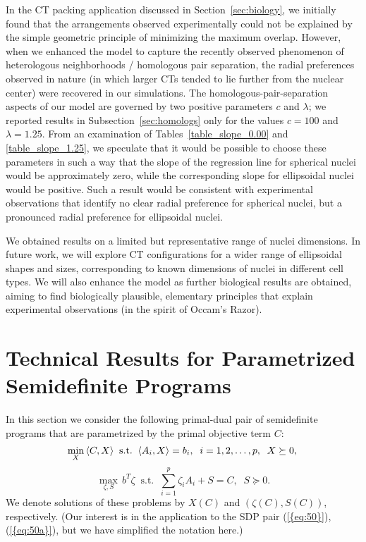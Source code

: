 \documentclass{siamltex}
\begin{document}
In the CT packing application discussed in Section~\ref{sec:biology},
we initially found that the arrangements observed experimentally could
not be explained by the simple geometric principle of minimizing the
maximum overlap. However, when we enhanced the model to capture the
recently observed phenomenon of heterologous neighborhoods /
homologous pair separation, the radial preferences observed in nature
(in which larger CTs tended to lie further from the nuclear center)
were recovered in our simulations.  The homologous-pair-separation
aspects of our model are governed by two positive parameters $c$ and
$\lambda$; we reported results in Subsection~\ref{sec:homologs} only
for the values $c=100$ and $\lambda=1.25$. From an examination of
Tables~\ref{table_slope_0.00} and \ref{table_slope_1.25}, we speculate
that it would be possible to choose these parameters in such a way
that the slope of the regression line for spherical nuclei would be
approximately zero, while the corresponding slope for ellipsoidal
nuclei would be positive. Such a result would be consistent with
experimental observations that identify no clear radial preference for
spherical nuclei, but a pronounced radial preference for ellipsoidal
nuclei.

We obtained results on a limited but representative range of nuclei
dimensions. In future work, we will explore CT configurations for a
wider range of ellipsoidal shapes and sizes, corresponding to known
dimensions of nuclei in different cell types. We will also enhance the
model as further biological results are obtained, aiming to find
biologically plausible, elementary principles that explain
experimental observations (in the spirit of Occam's Razor).

\appendix

\section{Technical Results for Parametrized Semidefinite Programs}

In this section we consider the following primal-dual pair of
semidefinite programs that are parametrized by the primal objective
term $C$:
\begin{equation} \label{eq:sdpp}
\min_X \, \langle C,X \rangle \;\; \mbox{s.t.} \;\; \langle A_i, X \rangle = b_i, \;\; i=1,2,\dotsc,p, \;\; X \succeq 0, \\
\end{equation}
\begin{equation} \label{eq:sdpd}
\max_{\zeta,S} \, b^T\zeta \;\; \mbox{s.t.} \;\; \sum_{i=1}^p \zeta_i A_i + S = C, \;\; S \succeq 0.
\end{equation}
We denote solutions of these problems by $X(C)$ and $(\zeta(C),S(C))$,
respectively. (Our interest is in the application to the SDP pair
{(\ref{{eq:50}})}, {(\ref{{eq:50a}})}, but we have simplified the notation
here.)
\end{document}
